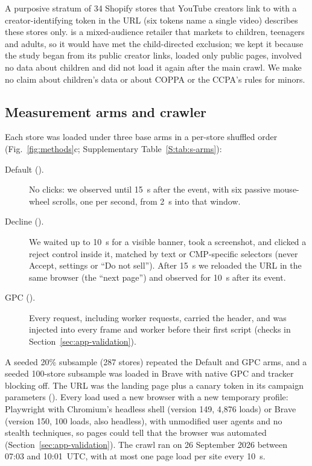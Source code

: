 A purposive stratum of 34 Shopify stores that YouTube creators link to with a creator-identifying token in the URL (six tokens name a single video) describes these stores only. \storeC is a mixed-audience retailer that markets to children, teenagers and adults, so it would have met the child-directed exclusion; we kept it because the study began from its public creator links, loaded only public pages, involved no data about children and did not load it again after the main crawl. We make no claim about children's data or about COPPA or the CCPA's rules for minors.

\subsection{Measurement arms and crawler}\label{sec:method-arms}

Each store was loaded under three base arms in a per-store shuffled order (Fig.~\ref{fig:methods}c; Supplementary Table~\ref*{S:tab:s-arms}):
\begin{description}
  \item[Default (\mkDefault).] No clicks: we observed until 15~s after the  event, with six passive mouse-wheel scrolls, one per second, from 2~s into that window.
  \item[Decline (\mkDecline).] We waited up to 10~s for a visible banner, took a screenshot, and clicked a reject control inside it, matched by text or CMP-specific selectors (never Accept, settings or ``Do not sell''). After 15~s we reloaded the URL in the same browser (the ``next page'') and observed for 10~s after its  event.
  \item[GPC (\mkGPC).] Every request, including worker requests, carried the  header, and  was injected into every frame and worker before their first script (checks in Section~\ref{sec:app-validation}).
\end{description}
A seeded 20\% subsample (287 stores) repeated the Default and GPC arms, and a seeded 100-store subsample was loaded in Brave with native GPC and tracker blocking off. The URL was the landing page plus a canary token in its campaign parameters (). Every load used a new browser with a new temporary profile: Playwright \citep{playwright} with Chromium's headless shell (version 149, 4,876 loads) or Brave (version 150, 100 loads, also headless), with unmodified user agents and no stealth techniques, so pages could tell that the browser was automated (Section~\ref{sec:app-validation}). The crawl ran on 26 September 2026 between 07:03 and 10:01~UTC, with at most one page load per site every 10~s.

